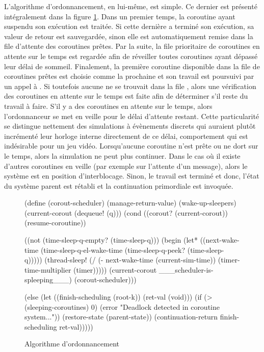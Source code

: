 \documentclass[12pt,twoside,letterpaper,francais]{book}
\newcommand{\scheme}[1]{\selectlanguage{english}{\tt #1}\selectlanguage{french}}
\begin{document}
L'algorithme d'ordonnancement, en lui-même, est simple. Ce dernier est
présenté intégralement dans la figure \ref{Corout:scheduler}. Dans un
premier temps, la coroutine ayant suspendu son exécution est
traitée. Si cette dernière a terminé son exécution, sa valeur de
retour est sauvegardée, sinon elle est automatiquement remise dans la
file d'attente des coroutines prêtes. Par la suite, la file
prioritaire de coroutines en attente sur le temps est regardée afin de
réveiller toutes coroutines ayant dépassé leur délai de
sommeil. Finalement, la première coroutine disponible dans la file de
coroutines prêtes est choisie comme la prochaine et son travail est
poursuivi par un appel à \scheme{resume-coroutine}. Si toutefois
aucune ne se trouvait dans la file \scheme{q}, alors une vérification
des coroutines en attente sur le temps est faite afin de déterminer
s'il reste du travail à faire. S'il y a des coroutines en attente sur
le temps, alors l'ordonnanceur se met en veille pour le délai
d'attente restant. Cette particularité se distingue nettement des
simulations à évènements discrets qui auraient plutôt incrémenté leur
horloge interne directement de ce délai, comportement qui est
indésirable pour un jeu vidéo. Lorsqu'aucune coroutine n'est prête ou
ne dort sur le temps, alors la simulation ne peut plus continuer. Dans
le cas où il existe d'autres coroutines en veille (par exemple sur
l'attente d'un message), alors le système est en position
d'interblocage. Sinon, le travail est terminé et donc, l'état du
système parent est rétabli et la continuation primordiale est
invoquée.\\

\begin{figure}[htb!]
  \begin{schemecode}
(define (corout-scheduler)
  (manage-return-value)
  (wake-up-sleepers)
  (current-corout (dequeue! (q)))
  (cond
   ((corout? (current-corout)) (resume-coroutine))

   ((not (time-sleep-q-empty? (time-sleep-q)))
    (begin
      (let* ((next-wake-time
              (time-sleep-q-el-wake-time 
                (time-sleep-q-peek? (time-sleep-q)))))
        (thread-sleep! (/ (- next-wake-time (current-sim-time))
                          (timer-time-multiplier (timer)))))
      (current-corout \_\_\_scheduler-is-spleeping\_\_\_)
      (corout-scheduler)))
      
   (else
    (let ((finish-scheduling (root-k))
          (ret-val (void)))
      (if (> (sleeping-coroutines) 0)
          (error "Deadlock detected in coroutine system..."))
      (restore-state (parent-state))
      (continuation-return finish-scheduling ret-val)))))
  \end{schemecode}
  \caption{Algorithme d'ordonnancement}
  \label{Corout:scheduler}
\end{figure}
\end{document}
